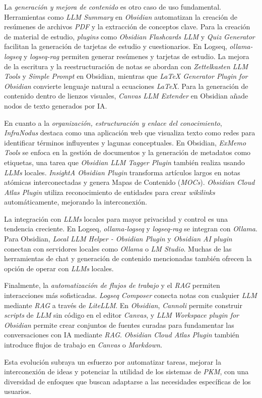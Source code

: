 \newpage

La \textit{generación y mejora de contenido} es otro caso de uso fundamental. Herramientas como \textit{LLM Summary} en \textit{Obsidian} automatizan la creación de resúmenes de archivos \textit{PDF} y la extracción de conceptos clave. Para la creación de material de estudio, \textit{plugins} como \textit{Obsidian Flashcards LLM} y \textit{Quiz Generator} facilitan la generación de tarjetas de estudio y cuestionarios. En Logseq, \textit{ollama-logseq} y \textit{logseq-rag} permiten generar resúmenes y tarjetas de estudio. La mejora de la escritura y la reestructuración de notas se abordan con \textit{Zettelkasten LLM Tools} y \textit{Simple Prompt} en Obsidian, mientras que \textit{LaTeX Generator Plugin for Obsidian} convierte lenguaje natural a ecuaciones \textit{LaTeX}. Para la generación de contenido dentro de lienzos visuales, \textit{Canvas LLM Extender} en Obsidian añade nodos de texto generados por IA.

En cuanto a la \textit{organización, estructuración y enlace del conocimiento}, \textit{InfraNodus} destaca como una aplicación web que visualiza texto como redes para identificar términos influyentes y lagunas conceptuales. En Obsidian, \textit{ExMemo Tools} se enfoca en la gestión de documentos y la generación de metadatos como etiquetas, una tarea que \textit{Obsidian LLM Tagger Plugin} también realiza usando \textit{LLMs} locales. \textit{InsightA Obsidian Plugin} transforma artículos largos en notas atómicas interconectadas y genera Mapas de Contenido (\textit{MOCs}). \textit{Obsidian Cloud Atlas Plugin} utiliza reconocimiento de entidades para crear \textit{wikilinks} automáticamente, mejorando la interconexión.

La integración con \textit{LLMs} locales para mayor privacidad y control es una tendencia creciente. En Logseq, \textit{ollama-logseq} y \textit{logseq-rag} se integran con \textit{Ollama}. Para Obsidian, \textit{Local LLM Helper - Obsidian Plugin} y \textit{Obsidian AI plugin} conectan con servidores locales como \textit{Ollama} o \textit{LM Studio}. Muchas de las herramientas de chat y generación de contenido mencionadas también ofrecen la opción de operar con \textit{LLMs} locales.

Finalmente, la \textit{automatización de flujos de trabajo} y el \textit{RAG} permiten interacciones más sofisticadas. \textit{Logseq Composer} conecta notas con cualquier \textit{LLM} mediante \textit{RAG} a través de \textit{LiteLLM}. En \textit{Obsidian}, \textit{Cannoli} permite construir \textit{scripts} de \textit{LLM} sin código en el editor \textit{Canvas}, y \textit{LLM Workspace plugin for Obsidian} permite crear conjuntos de fuentes curadas para fundamentar las conversaciones con IA mediante \textit{RAG}. \textit{Obsidian Cloud Atlas Plugin} también introduce flujos de trabajo en \textit{Canvas} o \textit{Markdown}.

Esta evolución subraya un esfuerzo por automatizar tareas, mejorar la interconexión de ideas y potenciar la utilidad de los sistemas de \textit{PKM}, con una diversidad de enfoques que buscan adaptarse a las necesidades específicas de los usuarios.